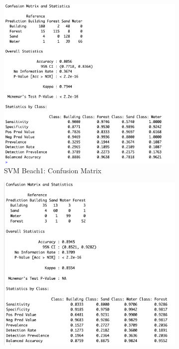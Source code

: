 \documentclass[a4paper,12pt]{article}
\begin{document}
\begin{figure}[H]
    \centering
    \begin{subfigure}[b]{0.48\linewidth} %
        \centering
        \includegraphics[width=\linewidth]{Support Vector Machine/SVM Beach1 Condusionmatrx.png}
        \caption{SVM Beach1: Confusion Matrix}
        \label{fig:rf_training_classes}
    \end{subfigure}
    \hspace{0.02\linewidth} %
    \begin{subfigure}[b]{0.48\linewidth}
        \centering
        \includegraphics[width=\linewidth]{Support Vector Machine/Support Vector Machine Beach2.png}

\end{subfigure}
\end{figure}
\end{document}
